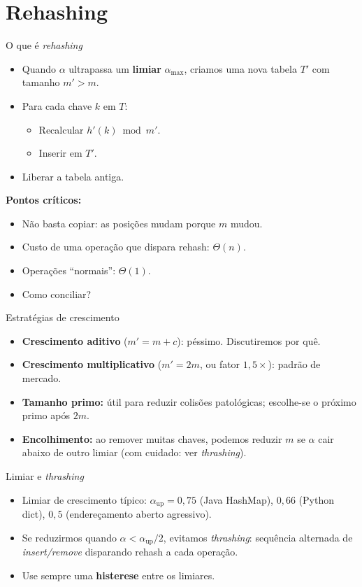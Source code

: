 \documentclass[aspectratio=169]{beamer}
\begin{document}
\section{Rehashing}

\begin{frame}{O que é \emph{rehashing}}
\begin{itemize}
    \item Quando $\alpha$ ultrapassa um \textbf{limiar} $\alpha_{\max}$, criamos
    uma nova tabela $T'$ com tamanho $m' > m$.
    \item Para cada chave $k$ em $T$:
    \begin{itemize}
        \item Recalcular $h'(k) \bmod m'$.
        \item Inserir em $T'$.
    \end{itemize}
    \item Liberar a tabela antiga.
\end{itemize}
\bigskip
\textbf{Pontos críticos:}
\begin{itemize}
    \item Não basta copiar: as posições mudam porque $m$ mudou.
    \item Custo de uma operação que dispara rehash: $\Theta(n)$.
    \item Operações ``normais'': $\Theta(1)$.
    \item Como conciliar?
\end{itemize}
\end{frame}

\begin{frame}{Estratégias de crescimento}
\begin{itemize}
    \item \textbf{Crescimento aditivo} ($m' = m + c$): péssimo. Discutiremos por quê.
    \item \textbf{Crescimento multiplicativo} ($m' = 2m$, ou fator $1{,}5\times$): padrão
    de mercado.
    \item \textbf{Tamanho primo:} útil para reduzir colisões patológicas; escolhe-se
    o próximo primo após $2m$.
    \item \textbf{Encolhimento:} ao remover muitas chaves, podemos reduzir $m$ se
    $\alpha$ cair abaixo de outro limiar (com cuidado: ver \emph{thrashing}).
\end{itemize}
\end{frame}

\begin{frame}{Limiar e \emph{thrashing}}
\begin{itemize}
    \item Limiar de crescimento típico: $\alpha_{\text{up}} = 0{,}75$ (Java HashMap),
    $0{,}66$ (Python dict), $0{,}5$ (endereçamento aberto agressivo).
    \item Se reduzirmos quando $\alpha < \alpha_{\text{up}}/2$, evitamos \emph{thrashing}:
    sequência alternada de \emph{insert/remove} disparando rehash a cada operação.
    \item Use sempre uma \textbf{histerese} entre os limiares.
\end{itemize}
\end{frame}
\end{document}
